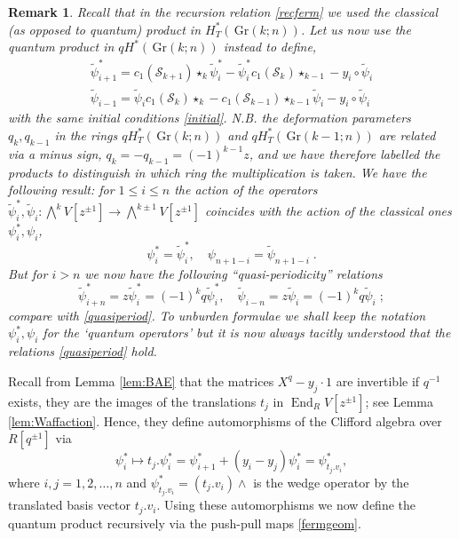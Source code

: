 \documentclass[12pt]{amsart}
\newcommand{\cS}{\mathcal{S}}
\newcommand{\Gr}{\,\mathrm{Gr}}
\newcommand{\End}{\operatorname{End}}
\newcommand{\ring}{R}
\newtheorem{remark}{Remark}[section]
\numberwithin{equation}{section}
\numberwithin{figure}{section}
\begin{document}
\begin{remark}\rm
Recall that in the recursion relation \eqref{recferm} we used the classical (as opposed to quantum) product in $H^*_T(\Gr(k;n))$. Let us  now use the quantum product in $qH^*(\Gr(k;n))$ instead to define, 
\begin{gather*}
\widetilde{\psi}^*_{i + 1} = c_1(\cS_{k + 1}) \star_{k} \widetilde{\psi}^*_i - \widetilde{\psi}^*_i c_1(\cS_k) \star_{k-1} - y_i \circ \widetilde{\psi}_i\\
\widetilde{\psi}_{i - 1} = \widetilde{\psi}_i c_1(\cS_k) \star_{k} - c_1(\cS_{k - 1}) \star_{k-1} \widetilde{\psi}_i - y_i \circ \widetilde{\psi}_i 
\end{gather*}
with the same initial conditions \eqref{initial}. N.B. the deformation parameters $q_k,q_{k-1}$ in the rings $qH^*_T(\Gr(k;n))$ and $qH^*_T(\Gr(k-1;n))$ are related via a minus sign, $q_k=-q_{k-1}=(-1)^{k-1}z$, and we have therefore labelled the products to distinguish in which ring the multiplication is taken. We have the following result:
    for $ 1 \leq  i \leq n$ the action of the operators  $\tilde\psi_i^*,\tilde\psi_i:\bigwedge^k V[z^{\pm1}]\to \bigwedge^{k \pm 1} V[z^{\pm1}]$ coincides with the action of the classical ones $\psi^*_i, \psi_i$,
    \[
    \psi^*_i = \widetilde{\psi}_i^*, \quad \psi_{n + 1 -i} = \widetilde{\psi}_{n + 1 -i}\;.
    \]
    But for $i>n$ we now have the following ``quasi-periodicity'' relations
    \[
    \widetilde{\psi}^*_{i + n} = z \widetilde{\psi}^*_{i} = (-1)^{k} q \widetilde{\psi}_i^*, \quad \widetilde{\psi}_{i - n} = z \widetilde{\psi}_i = (-1)^{k} q \widetilde{\psi}_i\;;
    \]
    compare with \eqref{quasiperiod}. To unburden formulae we shall keep the notation $\psi^*_i,\psi_i$ for the `quantum operators' but it is now always tacitly understood that the relations \eqref{quasiperiod} hold.     
\end{remark}
Recall from Lemma \ref{lem:BAE} that the matrices $X^q-y_j\cdot1$ are invertible if $q^{-1}$ exists, they are the images of the translations $t_j$ in $\End_{\ring} V[z^{\pm 1}]$; see Lemma \ref{lem:Waffaction}. Hence, they define automorphisms of the Clifford algebra over $\ring[q^{\pm1}]$ via 
    \[
    \psi_i^*\mapsto t_j.\psi^*_i = \psi^*_{i + 1} + (y_i - y_j)\psi^*_i=\psi^*_{t_j.v_i},
    \]
where $i,j=1,2,\ldots,n$ and $\psi^*_{t_j.v_i}=(t_j.v_i)\wedge$ is the wedge operator by the translated basis vector $t_j.v_i$. Using these automorphisms we now define the quantum product recursively via the push-pull maps \eqref{fermgeom}. 
\end{document}
